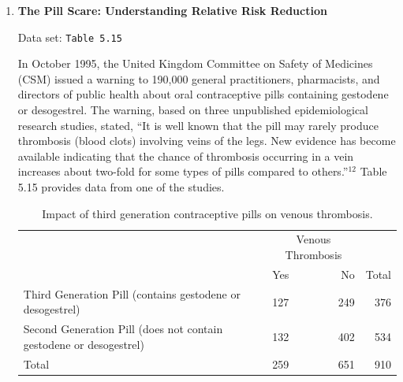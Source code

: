 \documentclass[
]{report}
\begin{document}
\begin{enumerate}
  \begin{enumerate}
    \item Conduct a chi-square test to test the hypothesis that the proportion of deaths is different depending on the drug (treatment or placebo). Write the null and alternative hypotheses and clearly state your conclusions.
    \item The extended activities showed that the percentage of deaths from heart attacks only changed from 8.5\% to 5\% over a five-year time period. Is this difference of 3.5\% too small to be of practical importance? Why or why not?
  \end{enumerate}

  \item \textbf{The Pill Scare: Understanding Relative Risk Reduction}    

  Data set: \texttt{Table 5.15}
  
  In October 1995, the United Kingdom Committee on Safety of Medicines (CSM) issued a warning to 190,000 general practitioners, pharmacists, and directors of public health about oral contraceptive pills containing gestodene or desogestrel. The warning, based on three unpublished epidemiological research studies, stated, “It is well known that the pill may rarely produce thrombosis (blood clots) involving veins of the legs. New evidence has become available indicating that the chance of thrombosis occurring in a vein increases about two-fold for some types of pills compared to others.”$^{12}$ Table 5.15 provides data from one of the studies.  

\begin{table}[!h]
\centering
\caption{\label{tab:tab15} Impact of third generation contraceptive pills on venous thrombosis.}
\centering
\begin{tabular}[t]{>{\raggedright\arraybackslash}p{6cm}lrr}
\toprule
\multicolumn{1}{c}{ } & \multicolumn{2}{c}{Venous Thrombosis} & \multicolumn{1}{c}{ } \\
\cmidrule(l{3pt}r{3pt}){2-3}
  & Yes & No & Total\\
\midrule
Third Generation Pill
(contains gestodene or desogestrel) & 127 & 249 & 376\\
Second Generation Pill
(does not contain gestodene or desogestrel) & 132 & 402 & 534\\
Total & 259 & 651 & 910\\
\bottomrule
\end{tabular}
\end{table}


\end{enumerate}
\end{document}
